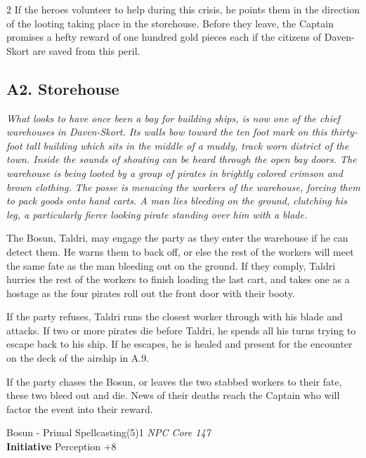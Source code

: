 \begin{multicols}{2}
If the heroes volunteer to help during this crisis, he points them in the direction of the looting taking place in the storehouse. Before they leave, the Captain promises a hefty reward of one hundred gold pieces each if the citizens of Daven-Skort are saved from this peril.

\subsection{A2. Storehouse}

\begin{pf-parchment}[\textcolor{title1}{Description}]
  \textcolor{title1}{\textit{What looks to have once been a bay for building ships, is now one of the chief warehouses in Daven-Skort. Its walls bow toward the ten foot mark on this thirty-foot tall building which sits in the middle of a muddy, track worn district of the town. Inside the sounds of shouting can be heard through the open bay doors.
	The warehouse is being looted by a group of pirates in brightly colored crimson and brown clothing. The posse is menacing the workers of the warehouse, forcing them to pack goods onto hand carts. A man lies bleeding on the ground, clutching his leg, a particularly fierce looking pirate standing over him with a blade.}}
\end{pf-parchment}

The Bosun, Taldri, may engage the party as they enter the warehouse if he can detect them. He warns them to back off, or else the rest of the workers will meet the same fate as the man bleeding out on the ground. If they comply, Taldri hurries the rest of the workers to finish loading the last cart, and takes one as a hostage as the four pirates roll out the front door with their booty.

If the party refuses, Taldri runs the closest worker through with his blade and attacks. If two or more pirates die before Taldri, he spends all his turns trying to escape back to his ship. If he escapes, he is healed and present for the encounter on the deck of the airship in A.9.

If the party chases the Bosun, or leaves the two stabbed workers to their fate, these two bleed out and die. News of their deaths reach the Captain who will factor the event into their reward.

  \begin{creaturebox}{Bosun - Primal Spellcasting(5)}{1}
    \textit{NPC Core 147}\\
    \textbf{Initiative} Perception +8
  \end{creaturebox}


\end{multicols}

